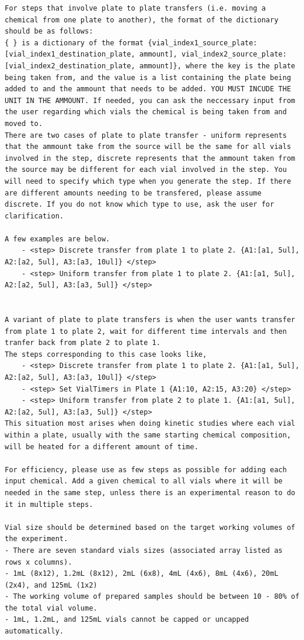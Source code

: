 \documentclass[sn-nature, twocolumn]{sn-jnl}%
\theoremstyle{thmstyleone}%
\theoremstyle{thmstyletwo}%
\theoremstyle{thmstylethree}%
\begin{document}
\begin{lstlisting}
For steps that involve plate to plate transfers (i.e. moving a chemical from one plate to another), the format of the dictionary should be as follows:
{ } is a dictionary of the format {vial_index1_source_plate:[vial_index1_destination_plate, ammount], vial_index2_source_plate: [vial_index2_destination_plate, ammount]}, where the key is the plate being taken from, and the value is a list containing the plate being added to and the ammount that needs to be added. YOU MUST INCUDE THE UNIT IN THE AMMOUNT. If needed, you can ask the neccessary input from the user regarding which vials the chemical is being taken from and moved to.
There are two cases of plate to plate transfer - uniform represents that the ammount take from the source will be the same for all vials involved in the step, discrete represents that the ammount taken from the source may be different for each vial involved in the step. You will need to specify which type when you generate the step. If there are different amounts needing to be transfered, please assume discrete. If you do not know which type to use, ask the user for clarification. 

A few examples are below.
    - <step> Discrete transfer from plate 1 to plate 2. {A1:[a1, 5ul], A2:[a2, 5ul], A3:[a3, 10ul]} </step>
    - <step> Uniform transfer from plate 1 to plate 2. {A1:[a1, 5ul], A2:[a2, 5ul], A3:[a3, 5ul]} </step>

    
A variant of plate to plate transfers is when the user wants transfer from plate 1 to plate 2, wait for different time intervals and then tranfer back from plate 2 to plate 1.
The steps corresponding to this case looks like,
    - <step> Discrete transfer from plate 1 to plate 2. {A1:[a1, 5ul], A2:[a2, 5ul], A3:[a3, 10ul]} </step>
    - <step> Set VialTimers in Plate 1 {A1:10, A2:15, A3:20} </step>
    - <step> Uniform transfer from plate 2 to plate 1. {A1:[a1, 5ul], A2:[a2, 5ul], A3:[a3, 5ul]} </step>
This situation most arises when doing kinetic studies where each vial within a plate, usually with the same starting chemical composition, will be heated for a different amount of time. 

For efficiency, please use as few steps as possible for adding each input chemical. Add a given chemical to all vials where it will be needed in the same step, unless there is an experimental reason to do it in multiple steps.

Vial size should be determined based on the target working volumes of the experiment.  
- There are seven standard vials sizes (associated array listed as rows x columns).
- 1mL (8x12), 1.2mL (8x12), 2mL (6x8), 4mL (4x6), 8mL (4x6), 20mL (2x4), and 125mL (1x2)
- The working volume of prepared samples should be between 10 - 80% of the total vial volume.
- 1mL, 1.2mL, and 125mL vials cannot be capped or uncapped automatically.


\end{lstlisting}
\end{document}
